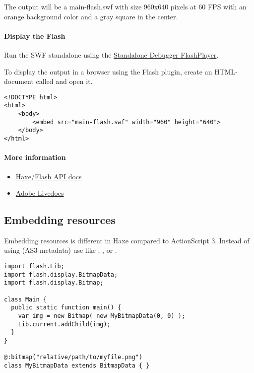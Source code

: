 The output will be a main-flash.swf with size 960x640 pixels at 60 FPS with an orange background color and a gray square in the center.

\paragraph{Display the Flash}

Run the SWF standalone using the \href{https://www.adobe.com/support/flashplayer/downloads.html}{Standalone Debugger FlashPlayer}. 

To display the output in a browser using the Flash plugin, create an HTML-document called  and open it.

\begin{lstlisting}
<!DOCTYPE html>
<html>
	<body>
		<embed src="main-flash.swf" width="960" height="640">
	</body>
</html>
\end{lstlisting}

\paragraph{More information}

\begin{itemize}
	\item \href{http://api.haxe.org/flash/}{Haxe/Flash API docs}
	\item \href{http://help.adobe.com/en_US/FlashPlatform/reference/actionscript/3/}{Adobe Livedocs}
\end{itemize}

\subsection{Embedding resources}
\label{target-flash-resources}

Embedding resources is different in Haxe compared to ActionScript 3. Instead of using \ic{\[embed\]} (AS3-metadata) use  like , ,  or .

\begin{lstlisting}
import flash.Lib;
import flash.display.BitmapData;
import flash.display.Bitmap;

class Main {
  public static function main() {
    var img = new Bitmap( new MyBitmapData(0, 0) );
    Lib.current.addChild(img);
  }
}

@:bitmap("relative/path/to/myfile.png") 
class MyBitmapData extends BitmapData { }
\end{lstlisting}

